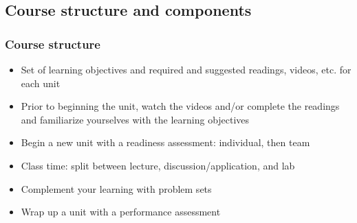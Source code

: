 \documentclass[slidestop,compress,mathserif,12pt,t,professionalfonts,xcolor=table]{beamer}
\begin{document}

\subsection{Course structure and components}


\begin{frame}
\frametitle{Course structure}

\begin{itemize}[<alert@+>]
\item Set of learning objectives and required and suggested readings, videos, etc. for each unit
\item Prior to beginning the unit, watch the videos and/or complete the readings and familiarize yourselves with the learning objectives
\item Begin a new unit with a readiness assessment: individual, then team 
\item Class time: split between lecture, discussion/application, and lab
\item Complement your learning with problem sets
\item Wrap up a unit with a performance assessment
\end{itemize}


\end{frame}

\end{document}
